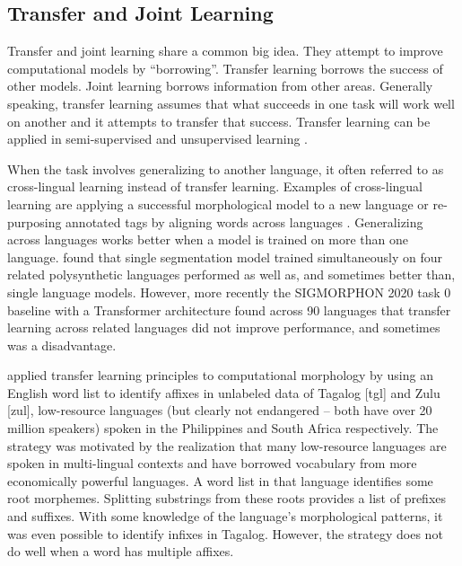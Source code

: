 \documentclass[12pt]{article}
\begin{document}
\subsection{Transfer and Joint Learning}
\label{transfer}

Transfer and joint learning share a common big idea. They attempt to improve computational models by ``borrowing''. Transfer learning borrows the success of other models. Joint learning borrows information from other areas. Generally speaking, transfer learning assumes that what succeeds in one task will work well on another and it attempts to transfer that success. Transfer learning can be applied in semi-supervised and unsupervised learning \cite{duong_natural_2017}. 

When the task involves generalizing to another language, it often referred to as cross-lingual learning instead of transfer learning. Examples of cross-lingual learning are applying a successful morphological model to a new language or re-purposing annotated tags by aligning words across languages \cite{duong_natural_2017}. Generalizing across languages works better when a model is trained on more than one language.  found that single segmentation model trained simultaneously on four related polysynthetic languages performed as well as, and sometimes better than, single language models. However, more recently the SIGMORPHON 2020 task 0 baseline with a Transformer architecture found across 90 languages that transfer learning across related languages did not improve performance, and sometimes was a disadvantage. %

 applied transfer learning principles to computational morphology by using an English word list to identify affixes in unlabeled data of Tagalog [tgl] and Zulu [zul], low-resource languages (but clearly not endangered -- both have over 20 million speakers) spoken in the Philippines and South Africa respectively. The strategy was motivated by the realization that many low-resource languages are spoken in multi-lingual contexts and have borrowed vocabulary from more economically powerful languages. A word list in that language identifies some root morphemes. Splitting substrings from these roots provides a list of prefixes and suffixes. With some knowledge of the language's morphological patterns, it was even possible to identify infixes in Tagalog. However, the strategy does not do well when a word has multiple affixes. 
\end{document}
